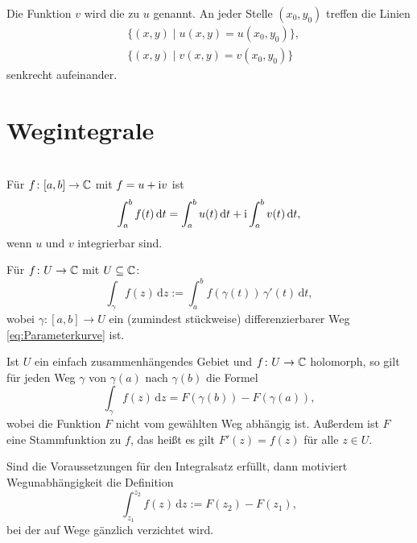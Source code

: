 Die Funktion $v$ wird die 
zu $u$ genannt. An jeder Stelle $(x_0,y_0)$ treffen die Linien%
\begin{align}
&\{(x,y)\mid u(x,y)=u(x_0,y_0)\},\\
&\{(x,y)\mid v(x,y)=v(x_0,y_0)\} 
\end{align}
senkrecht aufeinander.

\section{Wegintegrale}
\\
Für $f\colon [a,b]\to\mathbb C$ mit $f=u+\mathrm i v$ ist
\begin{equation}
\int_a^b f(t)\,\mathrm dt
= \int_a^b u(t)\,\mathrm dt+\mathrm i\int_a^b v(t)\,\mathrm dt,
\end{equation}
wenn $u$ und $v$ integrierbar sind.

\begin{definition}[Kurvenintegral]
Für $f\colon U\to\mathbb C$ mit $U\subseteq\mathbb C$:%
\begin{equation}
\int_\gamma f(z)\,\mathrm dz := \int_a^b f(\gamma(t))\,\gamma'(t)\,\mathrm dt,
\end{equation}
wobei $\gamma\colon [a,b]\to U$ ein (zumindest stückweise)
differenzierbarer Weg \eqref{eq:Parameterkurve} ist.
\end{definition}

\noindent
{}
Ist $U$ ein einfach zusammenhängendes Gebiet und $f\colon U\to\mathbb C$
holomorph, so gilt für jeden Weg $\gamma$ von $\gamma(a)$ nach
$\gamma(b)$ die Formel%
\begin{equation}
\int_\gamma f(z)\,\mathrm dz = F(\gamma(b))-F(\gamma(a)),
\end{equation}
wobei die Funktion $F$ nicht vom gewählten Weg abhängig ist.
Außerdem ist $F$ eine Stammfunktion zu $f$, das heißt es gilt
$F'(z)=f(z)$ für alle $z\in U$.

Sind die Voraussetzungen für den Integralsatz erfüllt,
dann motiviert Wegunabhängigkeit die Definition%
\begin{equation}
\int_{z_1}^{z_2} f(z)\,\mathrm dz := F(z_2)-F(z_1),
\end{equation}
bei der auf Wege gänzlich verzichtet wird.

